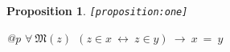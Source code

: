 \documentclass[a4paper,german,10pt,twoside]{book}
\newtheorem{prop}[thm]{Proposition}
\theoremstyle{definition}
\theoremstyle{remark}
\begin{document}
\begin{prop}
\label{proposition:one} \hypertarget{proposition:one}{}
{\tt \tiny [\verb]proposition:one]]}
\mbox{}
\begin{longtable}{{@{\extracolsep{\fill}}p{\linewidth}}}
\centering $\forall \ \mathfrak{M}(z)\ \ (z \in x\ \leftrightarrow\ z \in y)\ \rightarrow\ x \ = \ y$
\end{longtable}

\end{prop}




 \printindex
\end{document}
